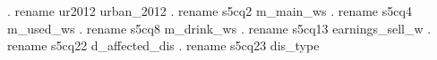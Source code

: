 . rename ur2012   urban_2012
{\smallskip}
. rename s5cq2    m_main_ws
{\smallskip}
. rename s5cq4    m_used_ws
{\smallskip}
. rename s5cq8    m_drink_ws
{\smallskip}
. rename s5cq13   earnings_sell_w
{\smallskip}
. rename s5cq22   d_affected_dis
{\smallskip}
. rename s5cq23   dis_type
{\smallskip}
